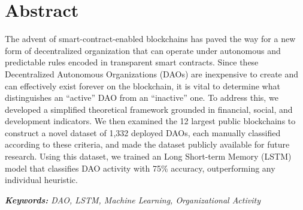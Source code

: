\chapter*{Abstract}
\noindent The advent of smart-contract-enabled blockchains has paved the way for a new form of decentralized organization that can operate under autonomous and predictable rules encoded in transparent smart contracts. Since these Decentralized Autonomous Organizations (DAOs) are inexpensive to create and can effectively exist forever on the blockchain, it is vital to determine what distinguishes an “active” DAO from an “inactive” one. To address this, we developed a simplified theoretical framework grounded in financial, social, and development indicators. We then examined the 12 largest public blockchains to construct a novel dataset of 1,332 deployed DAOs, each manually classified according to these criteria, and made the dataset publicly available for future research. Using this dataset, we trained an Long Short-term Memory (LSTM) model that classifies DAO activity with 75\% accuracy, outperforming any individual heuristic.

\textit{\textbf{Keywords: } DAO, LSTM, Machine Learning, Organizational Activity}

